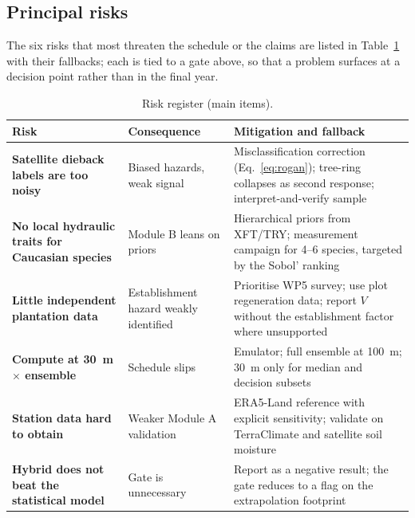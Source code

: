 \subsection{Principal risks}
The six risks that most threaten the schedule or the claims are listed in Table~\ref{tab:risk} with their fallbacks; each is tied to a gate above, so that a problem surfaces at a decision point rather than in the final year.
\begin{table}[t]
\centering
\caption{Risk register (main items).}\label{tab:risk}
\footnotesize
\begin{tabularx}{\linewidth}{@{}>{\raggedright\arraybackslash\bfseries\sffamily}p{3.5cm}>{\raggedright\arraybackslash}p{4.7cm}>{\raggedright\arraybackslash}X@{}}
\toprule
Risk & Consequence & Mitigation and fallback\\
\midrule
Satellite dieback labels are too noisy & Biased hazards, weak signal & Misclassification correction (Eq.~\ref{eq:rogan}); tree-ring collapses as second response; interpret-and-verify sample\\
No local hydraulic traits for Caucasian species & Module B leans on priors & Hierarchical priors from XFT/TRY; measurement campaign for 4--6 species, targeted by the Sobol' ranking\\
Little independent plantation data & Establishment hazard weakly identified & Prioritise WP5 survey; use plot regeneration data; report $V$ without the establishment factor where unsupported\\
Compute at 30~m $\times$ ensemble & Schedule slips & Emulator; full ensemble at 100~m; 30~m only for median and decision subsets\\
Station data hard to obtain & Weaker Module A validation & ERA5-Land reference with explicit sensitivity; validate on TerraClimate and satellite soil moisture\\
Hybrid does not beat the statistical model & Gate is unnecessary & Report as a negative result; the gate reduces to a flag on the extrapolation footprint\\
\bottomrule
\end{tabularx}
\end{table}

